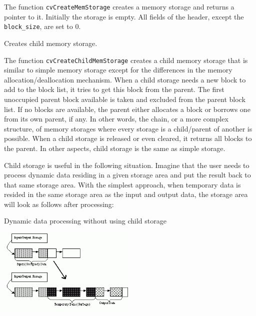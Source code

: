 The function \texttt{cvCreateMemStorage} creates a memory storage and returns a pointer to it. Initially the storage is empty. All fields of the header, except the \texttt{block\_size}, are set to 0.


\label{CreateChildMemStorage}

Creates child memory storage.


\begin{description}
\end{description}


The function \texttt{cvCreateChildMemStorage} creates a child memory
storage that is similar to simple memory storage except for the
differences in the memory allocation/deallocation mechanism. When a
child storage needs a new block to add to the block list, it tries
to get this block from the parent. The first unoccupied parent block
available is taken and excluded from the parent block list. If no blocks
are available, the parent either allocates a block or borrows one from
its own parent, if any. In other words, the chain, or a more complex
structure, of memory storages where every storage is a child/parent of
another is possible. When a child storage is released or even cleared,
it returns all blocks to the parent. In other aspects, child storage
is the same as simple storage.

Child storage is useful in the following situation. Imagine
that the user needs to process dynamic data residing in a given storage area and
put the result back to that same storage area. With the simplest approach,
when temporary data is resided in the same storage area as the input and
output data, the storage area will look as follows after processing:

Dynamic data processing without using child storage

\includegraphics[width=0.5\textwidth]{pics/memstorage1.png}

